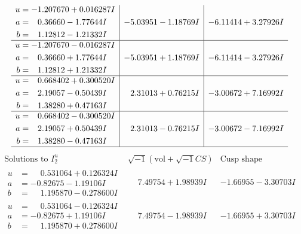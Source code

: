 \documentclass[1p]{elsarticle_modified}
\theoremstyle{definition}
\newcommand{\I}{\sqrt{-1}}
\begin{document}
$$\begin{array}{c|c|c}
\begin{aligned}
u &= -1.207670 + 0.016287 I \\
a &= \phantom{-}0.36660 - 1.77644 I \\
b &= \phantom{-}1.12812 - 1.21332 I\end{aligned}
 & -5.03951 - 1.18769 I & -6.11414 + 3.27926 I \\ \hline\begin{aligned}
u &= -1.207670 - 0.016287 I \\
a &= \phantom{-}0.36660 + 1.77644 I \\
b &= \phantom{-}1.12812 + 1.21332 I\end{aligned}
 & -5.03951 + 1.18769 I & -6.11414 - 3.27926 I \\ \hline\begin{aligned}
u &= \phantom{-}0.668402 + 0.300520 I \\
a &= \phantom{-}2.19057 - 0.50439 I \\
b &= \phantom{-}1.38280 + 0.47163 I\end{aligned}
 & \phantom{-}2.31013 + 0.76215 I & -3.00672 + 7.16992 I \\ \hline\begin{aligned}
u &= \phantom{-}0.668402 - 0.300520 I \\
a &= \phantom{-}2.19057 + 0.50439 I \\
b &= \phantom{-}1.38280 - 0.47163 I\end{aligned}
 & \phantom{-}2.31013 - 0.76215 I & -3.00672 - 7.16992 I\\
 \hline 
 \end{array}$$\newpage$$\begin{array}{c|c|c}  
\text{Solutions to }I^u_{2}& \I (\text{vol} + \sqrt{-1}CS) & \text{Cusp shape}\\
 \hline 
\begin{aligned}
u &= \phantom{-}0.531064 + 0.126324 I \\
a &= -0.82675 - 1.19106 I \\
b &= \phantom{-}1.195870 - 0.278600 I\end{aligned}
 & \phantom{-}7.49754 + 1.98939 I & -1.66955 - 3.30703 I \\ \hline\begin{aligned}
u &= \phantom{-}0.531064 - 0.126324 I \\
a &= -0.82675 + 1.19106 I \\
b &= \phantom{-}1.195870 + 0.278600 I\end{aligned}
 & \phantom{-}7.49754 - 1.98939 I & -1.66955 + 3.30703 I \\ \hline\begin{aligned}

\end{aligned}
\end{array}$$
\end{document}
